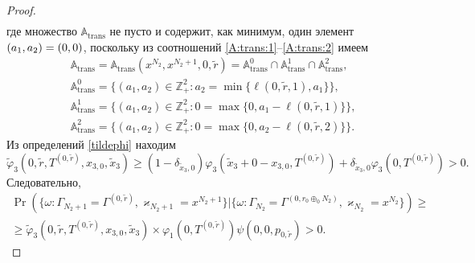 \begin{proof}
\begin{multline*}
\end{multline*}
где множество ${\mathbb A}_{\mathrm{trans}}$ не пусто и содержит,  как минимум,  один элемент $(a_1,  a_2)\hm=(0,  0)$,  поскольку из соотношений \eqref{A:trans:1}--\eqref{A:trans:2} имеем
\begin{align*}
&{\mathbb A}_{\mathrm{trans}} = {\mathbb A}_{\mathrm{trans}}(x^{N_2},  x^{N_2+1},  0,  \tilde{r}) = {\mathbb A}_{\mathrm{trans}}^0 \cap {\mathbb A}_{\mathrm{trans}}^1\cap {\mathbb A}_{\mathrm{trans}}^2, \\
&{\mathbb A}_{\mathrm{trans}}^0 = \{(a_1,  a_2) \in \mathbb{Z}_+^2 \colon a_2 = \min{\{\ell(0,  \tilde{r},  1),  a_1}\} \}, \\
&{\mathbb A}_{\mathrm{trans}}^1 = \{(a_1,  a_2) \in \mathbb{Z}_+^2 \colon 0=\max{\{0,  a_1-\ell(0,  \tilde{r}, 1)\}}\}, \\
 &{\mathbb A}_{\mathrm{trans}}^2= \{(a_1, a_2) \in \mathbb{Z}_+^2 \colon  0=\max{\{0,  a_2-\ell(0,  \tilde{r},  2)\}}\}.
\end{align*}
Из определений \eqref{tildephi} находим
\begin{equation*}
\widetilde{\varphi}_3(0,  \tilde{r},  T^{(0,  \tilde{r})},  x_{3,  0},  \tilde{x}_3)\geqslant (1-\delta_{\tilde{x}_3,  0}) \varphi_3(\tilde{x}_3 + 0 - x_{3,  0},  T^{(0,  \tilde{r})} ) + \delta_{\tilde{x}_3,  0} \varphi_3(0,  T^{(0,  \tilde{r})}) > 0.
\end{equation*}
Следовательно,  
\begin{multline*}
\Pr (\{\omega\colon\Gamma_{N_2+1}=\Gamma^{(0,  \tilde{r})}, \varkappa_{N_2+1}=x^{N_2+1} \}| \{\omega\colon\Gamma_{N_2}=\Gamma^{(0,  r_0\oplus_{0}N_2)}, \varkappa_{N_2}=x^{N_2}\})\geqslant\\
\geqslant \widetilde{\varphi}_3(0,  \tilde{r},  T^{(0,  \tilde{r})},  x_{3,  0},  \tilde{x}_3)
\times
\varphi_1(0,  T^{(0,  \tilde{r})}) \psi(0,  0,  p_{0,  \tilde{r}}) > 0.
\end{multline*}


\end{proof}
